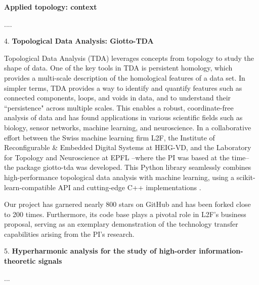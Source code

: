 \documentclass{amsart}
\begin{document}
	\textbf{Applied topology: context}

	....

	4. \textbf{Topological Data Analysis: Giotto-TDA}

	Topological Data Analysis (TDA) leverages concepts from topology to study the shape of data. One of the key tools in TDA is persistent homology, which provides a multi-scale description of the homological features of a data set. In simpler terms, TDA provides a way to identify and quantify features such as connected components, loops, and voids in data, and to understand their ``persistence" across multiple scales. This enables a robust, coordinate-free analysis of data and has found applications in various scientific fields such as biology, sensor networks, machine learning, and neuroscience. In a collaborative effort between the Swiss machine learning firm L2F, the Institute of Reconfigurable \& Embedded Digital Systems at HEIG-VD, and the Laboratory for Topology and Neuroscience at EPFL --where the PI was based at the time-- the package giotto-tda was developed. This Python library seamlessly combines high-performance topological data analysis with machine learning, using a scikit-learn-compatible API and cutting-edge C++ implementations \cite{medina2021giotto}.

	Our project has garnered nearly 800 stars on GitHub and has been forked close to 200 times.
	Furthermore, its code base plays a pivotal role in L2F's business proposal, serving as an exemplary demonstration of the technology transfer capabilities arising from the PI's research.

	5. \textbf{Hyperharmonic analysis for the study of high-order information-theoretic signals}

	...
\end{document}
